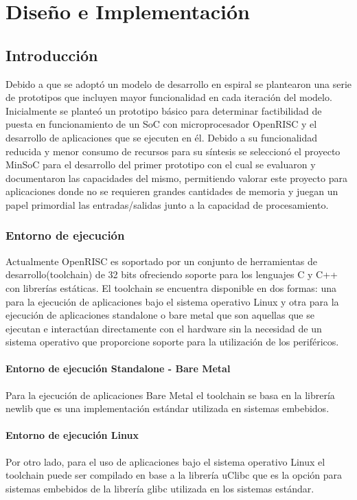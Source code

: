 \chapter{Diseño e Implementación}

	\section{Introducción}
	Debido a que se adoptó un modelo de desarrollo en espiral se plantearon una serie de prototipos que incluyen mayor funcionalidad en cada iteración
	del modelo. Inicialmente se planteó un prototipo básico para determinar factibilidad de puesta en funcionamiento de un SoC con microprocesador
	OpenRISC y el desarrollo de aplicaciones que se ejecuten en él. Debido a su funcionalidad reducida y menor consumo de recursos  para su síntesis se
	seleccionó el proyecto MinSoC para el desarrollo del primer prototipo con el cual se evaluaron y documentaron las capacidades del mismo, permitiendo
	valorar este proyecto para aplicaciones donde no se requieren grandes cantidades de memoria y juegan un papel primordial las entradas/salidas junto
	a la capacidad de procesamiento.  
		 
		\subsection{Entorno de ejecución}
		Actualmente OpenRISC es soportado por un conjunto de herramientas de desarrollo(toolchain) de 32 bits ofreciendo soporte para los lenguajes C y C++
		con librerías estáticas. El toolchain se encuentra disponible en dos formas: una para la ejecución de aplicaciones bajo el sistema operativo Linux y
		otra para la ejecución de aplicaciones standalone o bare metal que son aquellas que se ejecutan e interactúan directamente con el hardware sin la
		necesidad de un sistema operativo que proporcione soporte para la utilización de los periféricos.
		
			\subsubsection{Entorno de ejecución Standalone - Bare Metal}
	    	Para la ejecución de aplicaciones Bare Metal el toolchain se basa en la librería newlib que es una implementación estándar utilizada en
	    	sistemas embebidos. 
	    
			\subsubsection{Entorno de ejecución Linux}
			Por otro lado, para el uso de aplicaciones bajo el sistema operativo Linux el toolchain puede ser compilado en base a la librería uClibc que es la
			opción para sistemas embebidos de la librería glibc utilizada en los sistemas estándar.

